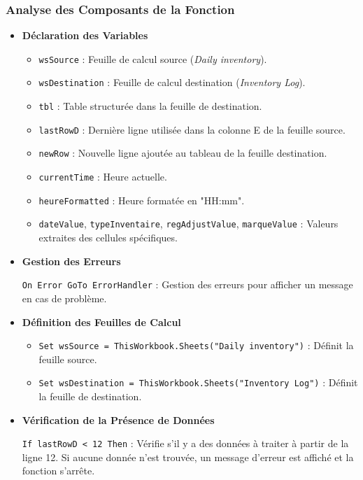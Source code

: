 \documentclass[a4paper, oneside, 12pt, final]{extreport}
\begin{document}
\subsubsection{Analyse des Composants de la Fonction}
\begin{itemize}

\item\textbf{Déclaration des Variables}

\begin{itemize}
    \item \texttt{wsSource} : Feuille de calcul source (\textit{Daily inventory}).
    \item \texttt{wsDestination} : Feuille de calcul destination (\textit{Inventory Log}).
    \item \texttt{tbl} : Table structurée dans la feuille de destination.
    \item \texttt{lastRowD} : Dernière ligne utilisée dans la colonne E de la feuille source.
    \item \texttt{newRow} : Nouvelle ligne ajoutée au tableau de la feuille destination.
    \item \texttt{currentTime} : Heure actuelle.
    \item \texttt{heureFormatted} : Heure formatée en "HH:mm".
    \item \texttt{dateValue}, \texttt{typeInventaire}, \texttt{regAdjustValue}, \texttt{marqueValue} : Valeurs extraites des cellules spécifiques.
\end{itemize}

\item\textbf{Gestion des Erreurs}

\texttt{On Error GoTo ErrorHandler} : Gestion des erreurs pour afficher un message en cas de problème.

\item\textbf{Définition des Feuilles de Calcul}

\begin{itemize}
    \item \texttt{Set wsSource = ThisWorkbook.Sheets("Daily inventory")} : Définit la feuille source.
    \item \texttt{Set wsDestination = ThisWorkbook.Sheets("Inventory Log")} : Définit la feuille de destination.
\end{itemize}

\item\textbf{Vérification de la Présence de Données}

\texttt{If lastRowD < 12 Then} : Vérifie s'il y a des données à traiter à partir de la ligne 12. Si aucune donnée n'est trouvée, un message d'erreur est affiché et la fonction s'arrête.


\end{itemize}
\end{document}
